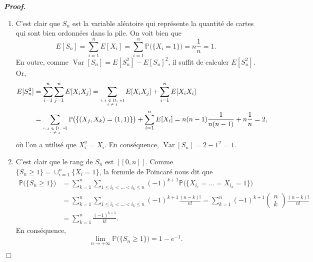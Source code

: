 \documentclass[11pt,a4paper]{article}
\newenvironment{preuve}[1][]
{\vskip 2mm  \noindent\emph{\bf Proof#1. }}{$\Box$ \vskip 2mm}
\let\geq\geqslant
\let\leq\leqslant
\begin{document}
\begin{preuve}
\begin{enumerate}
				\item 
				C'est clair que $S_{n}$ est la variable aléatoire qui représente la quantité de cartes qui sont bien ordonnées dans la pile. 
				On voit bien que 
				\[     E[S_{n}] = \sum_{i=1}^{n} E[X_{i}] = \sum_{i=1}^{n} \mathbb{P}\big(\{ X_{i} = 1\} \big) = n \frac{1}{n} = 1.     \]
				En outre, comme $\operatorname{Var}[S_{n}] = E[S_{n}^{2}] - E[S_{n}]^{2}$, il suffit de calculer $E[S_{n}^{2}]$. 
				Or, 
				\begin{align*}
				E[S_{n}^{2}] &= \sum_{i=1}^{n} \sum_{j=1}^{n} E[X_{i} X_{j}] = 
				\sum_{\text{\begin{tiny}$\begin{matrix} i, j \in [\![ 1,n]\!] \\ i \neq j \end{matrix}$\end{tiny}}} E[X_{i} X_{j}] + 
				\sum_{i=1}^{n} E[X_{i} X_{i}] 
				\\\
				&=  \sum_{\text{\begin{tiny}$\begin{matrix} i, j \in [\![ 1,n]\!] \\ i \neq j \end{matrix}$\end{tiny}}} \mathbb{P}\big(\{ (X_{j},X_{k}) = (1,1) \}\big) + \sum_{i=1}^{n} E[X_{i}]  = n(n-1) \frac{1}{n(n-1)} +  n \frac{1}{n} = 2,
				\end{align*}
				où l'on a utilisé que $X_{i}^{2} = X_{i}$. 
				En conséquence, $\operatorname{Var}[S_{n}] = 2 - 1^{2} = 1$. 
				
				\item C'est clair que le rang de $S_{n}$ est $[\![ 0, n ]\!]$. 
				Comme $\{ S_{n} \geq 1 \} = \cup_{i=1}^{n} \{ X_{i} = 1 \}$, la formule de Poincaré nous dit que 
				\begin{align*}
				\mathbb{P}\big(\{ S_{n} \geq 1 \}\big) &= \sum_{k=1}^{n} \sum_{1 \leq i_{1} < \dots < i_{k} \leq n} (-1)^{k+1} 
				\mathbb{P}\big(\{ X_{i_{1}} = \dots = X_{i_{k}} = 1 \}\big) 
				\\
				&= \sum_{k=1}^{n} \sum_{1 \leq i_{1} < \dots < i_{k} \leq n} (-1)^{k+1} \frac{(n-k)!}{n!} 
				= \sum_{k=1}^{n} (-1)^{k+1} \begin{pmatrix} n \\ k \end{pmatrix} \frac{(n-k)!}{n!} 
				\\
				&= \sum_{k=1}^{n} \frac{(-1)^{k+1}}{k!}.
				\end{align*}
				En conséquence, 
				\[          \underset{n \rightarrow + \infty}{\lim} \mathbb{P}\big(\{ S_{n} \geq 1 \}\big) = 1 - e^{-1}.     \]
				

\end{enumerate}
\end{preuve}
\end{document}
